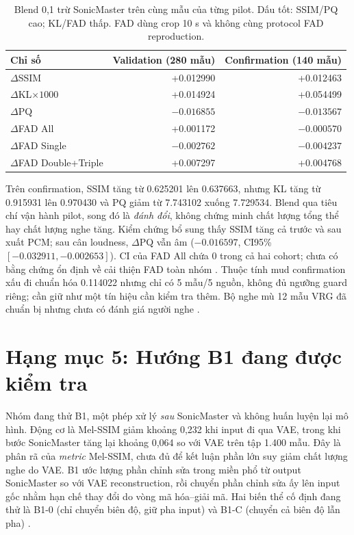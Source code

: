 \documentclass[10pt,a4paper]{article}
\begin{document}
\begin{table}[ht]
\centering\small
\caption{Blend 0,1 trừ SonicMaster trên cùng mẫu của từng pilot. Dấu tốt: SSIM/PQ cao; KL/FAD thấp. FAD dùng crop 10 s và không cùng protocol FAD reproduction.}
\begin{tabular}{lrr}
\toprule
Chỉ số & Validation (280 mẫu) & Confirmation (140 mẫu)\\
\midrule
$\Delta$SSIM & +0.012990 & +0.012463\\
$\Delta$KL$\times1000$ & +0.014924 & +0.054499\\
$\Delta$PQ & $-0.016855$ & $-0.013567$\\
$\Delta$FAD All & +0.001172 & $-0.000570$\\
$\Delta$FAD Single & $-0.002762$ & $-0.004237$\\
$\Delta$FAD Double+Triple & +0.007297 & +0.004768\\
\bottomrule
\end{tabular}
\end{table}
Trên confirmation, SSIM tăng từ 0.625201 lên 0.637663, nhưng KL tăng từ 0.915931 lên 0.970430 và PQ giảm từ 7.743102 xuống 7.729534. Blend qua tiêu chí vận hành pilot, song đó là \emph{đánh đổi}, không chứng minh chất lượng tổng thể hay chất lượng nghe tăng. Kiểm chứng bổ sung thấy SSIM tăng cả trước và sau xuất PCM; sau cân loudness, $\Delta$PQ vẫn âm ($-0.016597$, CI95\% $[-0.032911,-0.002653]$). CI của FAD All chứa 0 trong cả hai cohort; chưa có bằng chứng ổn định về cải thiện FAD toàn nhóm \cite{followup}. Thuộc tính mud confirmation xấu đi chuẩn hóa 0.114022 nhưng chỉ có 5 mẫu/5 nguồn, không đủ ngưỡng guard riêng; cần giữ như một tín hiệu cần kiểm tra thêm. Bộ nghe mù 12 mẫu VRG đã chuẩn bị nhưng chưa có đánh giá người nghe \cite{vrg}.

\section{Hạng mục 5: Hướng B1 đang được kiểm tra}
Nhóm đang thử B1, một phép xử lý \emph{sau} SonicMaster và không huấn luyện lại mô hình. Động cơ là Mel-SSIM giảm khoảng 0,232 khi input đi qua VAE, trong khi bước SonicMaster tăng lại khoảng 0,064 so với VAE trên tập 1.400 mẫu. Đây là phân rã của \emph{metric} Mel-SSIM, chưa đủ để kết luận phần lớn suy giảm chất lượng nghe do VAE. B1 ước lượng phần chỉnh sửa trong miền phổ từ output SonicMaster so với VAE reconstruction, rồi chuyển phần chỉnh sửa ấy lên input gốc nhằm hạn chế thay đổi do vòng mã hóa--giải mã. Hai biến thể cố định đang thử là B1-0 (chỉ chuyển biên độ, giữ pha input) và B1-C (chuyển cả biên độ lẫn pha) \cite{b1status}.
\end{document}
